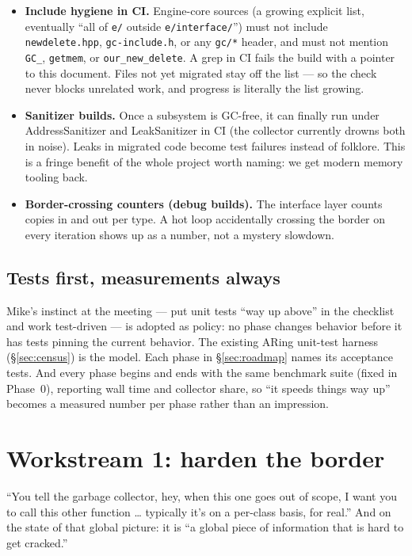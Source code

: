 \documentclass[11pt,oneside]{report}
\newcommand{\code}[1]{\textcolor{m2code}{\texttt{#1}}}
\newcommand{\file}[1]{\textcolor{m2file}{\texttt{#1}}}
\begin{document}
\begin{itemize}
\item \textbf{Include hygiene in CI.} Engine-core sources (a growing explicit
  list, eventually ``all of \file{e/} outside \file{e/interface/}'') must not
  include \file{newdelete.hpp}, \file{gc-include.h}, or any \file{gc/*}
  header, and must not mention \code{GC\_}, \code{getmem}, or
  \code{our\_new\_delete}. A grep in CI fails the build with a pointer to this
  document. Files not yet migrated stay off the list --- so the check never
  blocks unrelated work, and progress is literally the list growing.
\item \textbf{Sanitizer builds.} Once a subsystem is GC-free, it can finally
  run under AddressSanitizer and LeakSanitizer in CI (the collector currently
  drowns both in noise). Leaks in migrated code become test failures instead
  of folklore. This is a fringe benefit of the whole project worth naming: we
  get modern memory tooling back.
\item \textbf{Border-crossing counters (debug builds).} The interface layer
  counts copies in and out per type. A hot loop accidentally crossing the
  border on every iteration shows up as a number, not a mystery slowdown.
\end{itemize}

\subsection{Tests first, measurements always}
\label{sec:testsfirst}

Mike's instinct at the meeting --- put unit tests ``way up above'' in the
checklist and work test-driven --- is adopted as policy: no phase changes
behavior before it has tests pinning the current behavior. The existing ARing
unit-test harness (\S\ref{sec:census}) is the model. Each phase in
\S\ref{sec:roadmap} names its acceptance tests. And every phase begins and
ends with the same benchmark suite (fixed in Phase~0), reporting wall time
and collector share, so ``it speeds things way up'' becomes a measured
number per phase rather than an impression.

\section{Workstream 1: harden the border}
\label{sec:ws-border}

\begin{mikesays}[on finalization]
``You tell the garbage collector, hey, when this one goes out of scope, I
want you to call this other function \ldots{} typically it's on a per-class
basis, for real.'' And on the state of that global picture: it is
``a global piece of information that is hard to get cracked.''
\end{mikesays}
\end{document}
